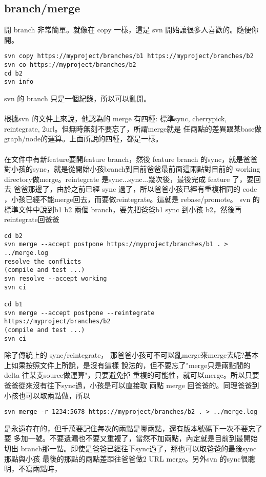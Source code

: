  \subsection{branch/merge}
  開 branch 非常簡單。就像在 copy 一樣，這是 svn 開始讓很多人喜歡的。隨便你開。
  \begin{verbatim}
svn copy https://myproject/branches/b1 https://myproject/branches/b2
svn co https://myproject/branches/b2
cd b2
svn info
  \end{verbatim}
  svn 的 branch 只是一個紀錄，所以可以亂開。
  \\\\
  根據svn 的文件上來說，他認為的 merge 有四種:
  標準sync, cherrypick, reintegrate, 2url。但無時無刻不要忘了，所謂merge就是
  任兩點的差異跟某base做graph/node的運算。上面所說的四種，都是一樣。
  \\\\
  在文件中有新feature要開feature branch，然後 feature branch 的sync，就是爸爸
  對小孩的sync，就是從開始小孩branch到目前爸爸最前面這兩點對目前的 working 
  directory做merge。reintegrate 是sync...sync...幾次後，最後完成 feature 了，要回去
  爸爸那邊了，由於之前已經 sync 過了，所以爸爸小孩已經有重複相同的 code
  ，小孩已經不能merge回去，而要做reintegrate。這就是 rebase/promote。
  svn 的標準文件中說到b1 b2 兩個 branch，要先把爸爸b1 sync 到小孩 b2，然後再
  reintegrate回爸爸
  \begin{verbatim}
cd b2
svn merge --accept postpone https://myproject/branches/b1 . > ../merge.log
resolve the conflicts
(compile and test ...)
svn resolve --accept working
svn ci

cd b1
svn merge --accept postpone --reintegrate https://myproject/branches/b2
(compile and test ...)
svn ci
  \end{verbatim}
  除了傳統上的 sync/reintegrate，
  那爸爸小孩可不可以亂merge來merge去呢?基本上如果按照文件上所說，是沒有這樣
  說法的，但不要忘了"merge只是兩點間的delta 往某支source做運算"，只要避免掉
  重複的可能性，就可以merge。所以只要爸爸從來沒有往下sync過，小孩是可以直接取
  兩點 merge 回爸爸的。同理爸爸到小孩也可以取兩點做，所以
  \begin{verbatim}
svn merge -r 1234:5678 https://myproject/branches/b2 . > ../merge.log
  \end{verbatim}
  是永遠存在的，但千萬要記住每次的兩點是哪兩點，還有版本號碼下一次不要忘了要
  多加一號。不要遺漏也不要又重複了，當然不加兩點，內定就是目前到最開始切出
  branch那一點。即使是爸爸已經往下sync過了，那也可以取爸爸的最後sync那點與小孩
  最後的那點的兩點差距往爸爸做2 URL merge。另外svn 的sync很聰明，不寫兩點時，
